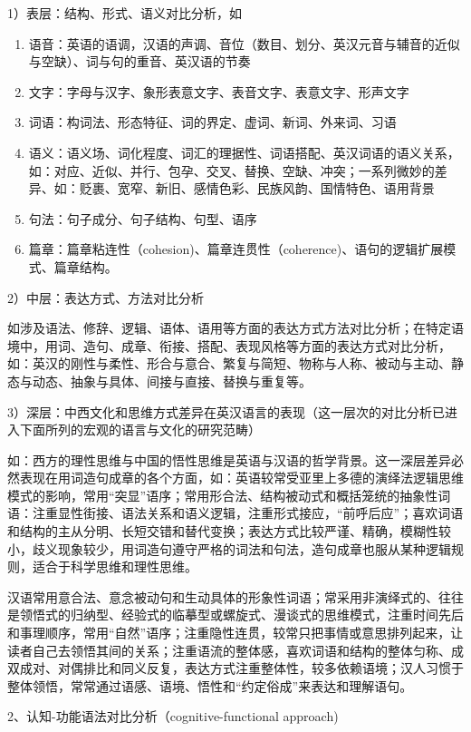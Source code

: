 1）表层：结构、形式、语义对比分析，如
\begin{enumerate}[label=\circled{\arabic*}]
    \item 语音：英语的语调，汉语的声调、音位（数目、划分、英汉元音与辅音的近似与空缺）、词与句的重音、英汉语的节奏
    \item 文字：字母与汉字、象形表意文字、表音文字、表意文字、形声文字
    \item 词语：构词法、形态特征、词的界定、虚词、新词、外来词、习语
    \item 语义：语义场、词化程度、词汇的理据性、词语搭配、英汉词语的语义关系，如：对应、近似、并行、包孕、交叉、替换、空缺、冲突；一系列微妙的差异、如：贬裹、宽窄、新旧、感情色彩、民族风韵、国情特色、语用背景
    \item 句法：句子成分、句子结构、句型、语序
    \item 篇章：篇章粘连性（cohesion)、篇章连贯性（coherence)、语句的逻辑扩展模式、篇章结构。
\end{enumerate}

2）中层：表达方式、方法对比分析

如涉及语法、修辞、逻辑、语体、语用等方面的表达方式方法对比分析；在特定语境中，用词、造句、成章、衔接、搭配、表现风格等方面的表达方式对比分析，如：英汉的刚性与柔性、形合与意合、繁复与简短、物称与人称、被动与主动、静态与动态、抽象与具体、间接与直接、替换与重复等。

3）深层：中西文化和思维方式差异在英汉语言的表现（这一层次的对比分析已进入下面所列的宏观的语言与文化的研究范畴）

如：西方的理性思维与中国的悟性思维是英语与汉语的哲学背景。这一深层差异必然表现在用词造句成章的各个方面，如：英语较常受亚里上多德的演绎法逻辑思维模式的影响，常用“突显”语序；常用形合法、结构被动式和概括笼统的抽象性词语：注重显性街接、语法关系和语义逻辑，注重形式接应，“前呼后应”；喜欢词语和结构的主从分明、长短交错和替代变换；表达方式比较严谨、精确，模糊性较小，歧义现象较少，用词造句遵守严格的词法和句法，造句成章也服从某种逻辑规则，适合于科学思维和理性思维。

汉语常用意合法、意念被动句和生动具体的形象性词语；常采用非演绎式的、往往是领悟式的归纳型、经验式的临摹型或螺旋式、漫谈式的思维模式，注重时间先后和事理顺序，常用“自然”语序；注重隐性连贯，较常只把事情或意思排列起来，让读者自己去领悟其间的关系；注重语流的整体感，喜欢词语和结构的整体匀称、成双成对、对偶排比和同义反复，表达方式注重整体性，较多依赖语境；汉人习惯于整体领悟，常常通过语感、语境、悟性和“约定俗成”来表达和理解语句。

2、认知-功能语法对比分析（cognitive-functional approach)

